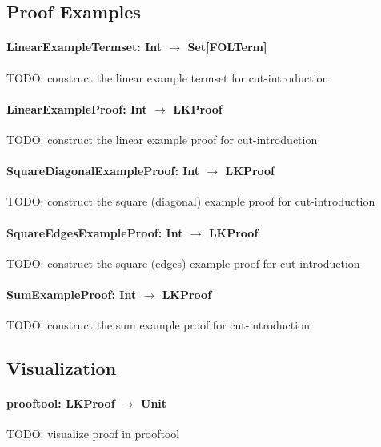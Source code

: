 \documentclass[a4paper, 11pt]{report}
\begin{document}
\subsection{Proof Examples}
\label{sec:exampleproofs}


\paragraph{\textbf{LinearExampleTermset: Int $\rightarrow$ Set[FOLTerm]}}
{\color{red}TODO}: construct the linear example termset for cut-introduction

\paragraph{\textbf{LinearExampleProof: Int $\rightarrow$ LKProof}}
{\color{red}TODO}: construct the linear example proof for cut-introduction

\paragraph{\textbf{SquareDiagonalExampleProof: Int $\rightarrow$ LKProof}}
{\color{red}TODO}: construct the square (diagonal) example proof for cut-introduction

\paragraph{\textbf{SquareEdgesExampleProof: Int $\rightarrow$ LKProof}}
{\color{red}TODO}: construct the square (edges) example proof for cut-introduction

\paragraph{\textbf{SumExampleProof: Int $\rightarrow$ LKProof}}
{\color{red}TODO}: construct the sum example proof for cut-introduction

\subsection{Visualization}

\paragraph{\textbf{prooftool: LKProof $\rightarrow$ Unit}}
{\color{red}TODO}: visualize proof in prooftool
\end{document}
